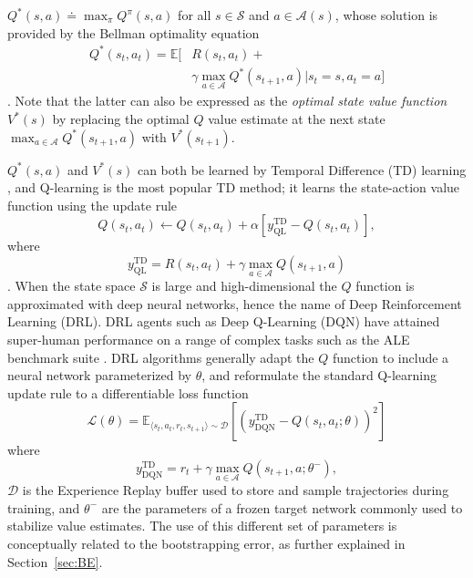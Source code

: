 $Q^*\left(s,a\right)\doteq\max_{\pi}Q^{\pi}\left(s,a\right)$ for all
$s\in\mathcal{S}$ and $a\in\mathcal{A}\left(s\right)$, whose solution
is provided by the Bellman optimality equation
\begin{equation}
\begin{aligned}
Q^*\left(s_t,a_t\right)=\mathbb{E}\bigg[&R\left(s_t,a_t\right)+\\ &\gamma
  \max_{a\in\mathcal{A}}Q^*\left(s_{t+1},a\right)\bigg\vert
  s_t=s,a_t=a \bigg]
\end{aligned}
\end{equation}
\citep{bellman1957dynamic}. Note that the latter can
also be expressed as the \textit{optimal state value function}
$V^*\left(s\right)$ by replacing the optimal $Q$ value estimate at
the next state
$\max_{a\in\mathcal{A}}Q^*\left(s_{t+1},a\right)$ with
$V^*\left(s_{t+1}\right)$.

$Q^*\left(s,a\right)$ and $V^*\left(s\right)$ can both be learned by
Temporal Difference (TD) learning
\citep{sutton1988learning}, and Q-learning is the most popular TD
method; it learns the state-action value function using the update
rule
\begin{equation}\label{eq:ql_bellman_backup}
Q\left(s_t,a_t\right)\leftarrow
Q\left(s_t,a_t\right)+\alpha\left[y^{\scriptscriptstyle
\textrm{TD}}_{\scriptscriptstyle \textrm{QL}}-Q\left(s_t,a_t\right)\right],
\end{equation}
where
\begin{equation}\label{eq:ql_td}
y^{\scriptscriptstyle \textrm{TD}}_{\scriptscriptstyle
\textrm{QL}}=R\left(s_t,a_t\right)+\gamma\max_{a\in\mathcal{A}}Q\left(s_{t+1},a\right)
\end{equation}
\citep{watkins1992q}. When the state space $\mathcal{S}$ is large and
high-dimensional the $Q$ function is approximated with
deep neural networks, hence the name of Deep Reinforcement Learning
(DRL). DRL agents such as Deep Q-Learning (DQN)
\citep{mnih2013playing} have attained super-human performance on a
range of complex tasks such as the ALE benchmark suite
\citep{bellemare2013arcade}. DRL algorithms generally adapt the $Q$
function to include a neural network parameterized by $\theta$, and
reformulate the standard Q-learning update rule to a differentiable
loss function
\begin{equation}
\mathcal{L}(\theta)=\mathbb{E}_{\langle s_t,a_t,r_t,s_{t+1}\rangle\sim
\mathcal{D}}\left[{\left(y^{\scriptscriptstyle \textrm{TD}}_{\scriptscriptstyle
\textrm{DQN}}-Q\left(s_t, a_t;\theta\right)\right)}^2\right]
\end{equation}
where
\begin{equation}\label{eq:dqn_td}
y^{\scriptscriptstyle \textrm{TD}}_{\scriptscriptstyle
\textrm{DQN}}=r_t+\gamma\max_{a\in\mathcal{A}}Q\left(s_{t+1},a;\theta^{-}\right),
\end{equation}
$\mathcal{D}$ is the Experience Replay buffer \citep{lin1992self} used
to store and sample trajectories during training, and $\theta^-$ are
the parameters of a frozen target network commonly used to stabilize
value estimates. The use of this different set of parameters is
conceptually related to the bootstrapping error, as further explained
in Section~\ref{sec:BE}.


